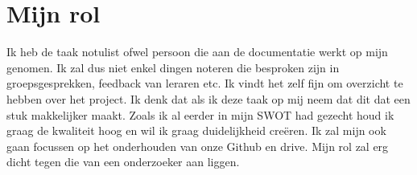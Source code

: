 \documentclass{article}
\begin{document}
\section{Mijn rol}

Ik heb de taak notulist ofwel persoon die aan de documentatie werkt op mijn genomen.
Ik zal dus niet enkel dingen noteren die besproken zijn in groepsgesprekken, feedback van leraren etc.
Ik vindt het zelf fijn om overzicht te hebben over het project.
Ik denk dat als ik deze taak op mij neem dat dit dat een stuk makkelijker maakt.
Zoals ik al eerder in mijn SWOT had gezecht houd ik graag de kwaliteit hoog en wil ik graag duidelijkheid cre\"eren.
Ik zal mijn ook gaan focussen op het onderhouden van onze Github en drive.
Mijn rol zal erg dicht tegen die van een onderzoeker aan liggen.
\end{document}
